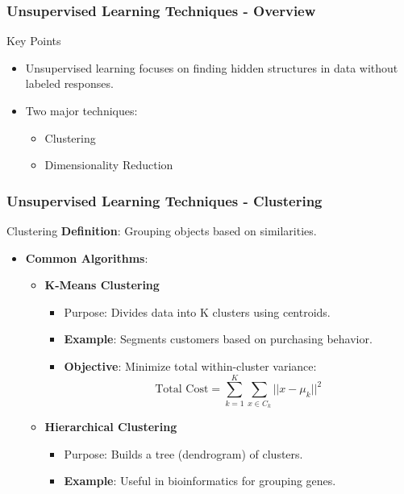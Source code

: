 \documentclass[aspectratio=169]{beamer}
\begin{document}
\begin{frame}[fragile]
    \frametitle{Unsupervised Learning Techniques - Overview}
    \begin{block}{Key Points}
        \begin{itemize}
            \item Unsupervised learning focuses on finding hidden structures in data without labeled responses.
            \item Two major techniques: 
            \begin{itemize}
                \item Clustering
                \item Dimensionality Reduction
            \end{itemize}
        \end{itemize}
    \end{block}
\end{frame}

\begin{frame}[fragile]
    \frametitle{Unsupervised Learning Techniques - Clustering}
    \begin{block}{Clustering}
        \textbf{Definition}: Grouping objects based on similarities.
    \end{block}
    \begin{itemize}
        \item \textbf{Common Algorithms}:
        \begin{itemize}
            \item \textbf{K-Means Clustering}
                \begin{itemize}
                    \item Purpose: Divides data into K clusters using centroids.
                    \item \textbf{Example}: Segments customers based on purchasing behavior.
                    \item \textbf{Objective}: Minimize total within-cluster variance:
                    \begin{equation}
                        \text{Total Cost} = \sum_{k=1}^{K} \sum_{x \in C_k} ||x - \mu_k||^2
                    \end{equation}
                \end{itemize}
            \item \textbf{Hierarchical Clustering}
                \begin{itemize}
                    \item Purpose: Builds a tree (dendrogram) of clusters.
                    \item \textbf{Example}: Useful in bioinformatics for grouping genes.
                \end{itemize}
        \end{itemize}
    \end{itemize}
\end{frame}
\end{document}
